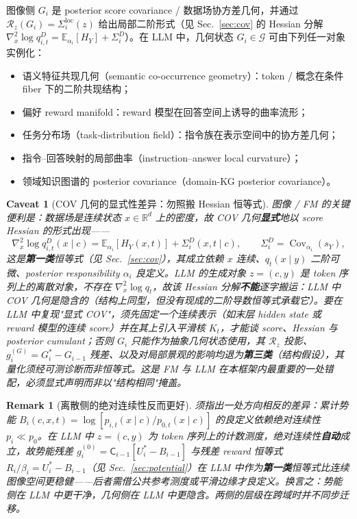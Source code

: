 \documentclass[11pt,a4paper]{article}
\newtheorem{remark}[theorem]{Remark}
\newtheorem{caveat}[theorem]{Caveat}
\DeclareMathOperator{\Cov}{Cov}
\newcommand{\E}{\mathbb{E}}
\newcommand{\R}{\mathbb{R}}
\newcommand{\cG}{\mathcal{G}}   %
\newcommand{\Rstr}{\mathcal{R}}     %
\newcommand{\Center}{\mathsf{C}}    %
\begin{document}
图像侧 $G_i$ 是 posterior score covariance / 数据场协方差几何，并通过 $\Rstr_z(G_i)=\Sigma_i^{\mathrm{loc}}(z)$ 给出局部二阶形式（见 Sec.~\ref{sec:cov} 的 Hessian 分解 $\nabla_x^2\log q_{i,t}^D=\E_{\alpha_i}[H_Y]+\Sigma_i^D$）。在 LLM 中，几何状态 $G_i\in\cG$ 可由下列任一对象实例化：
\begin{itemize}
\item 语义特征共现几何（semantic co-occurrence geometry）：token / 概念在条件 fiber 下的二阶共现结构；
\item 偏好 reward manifold：reward 模型在回答空间上诱导的曲率流形；
\item 任务分布场（task-distribution field）：指令族在表示空间中的协方差几何；
\item 指令--回答映射的局部曲率（instruction--answer local curvature）；
\item 领域知识图谱的 posterior covariance（domain-KG posterior covariance）。
\end{itemize}

\begin{caveat}[COV 几何的显式性差异：勿照搬 Hessian 恒等式]\label{cav:s11:explicit}
图像 / FM 的关键便利是：数据场是\emph{连续}状态 $x\in\R^d$ 上的密度，故 COV 几何\textbf{显式}地以 score Hessian 的形式出现——
\[
\nabla_x^2\log q_{i,t}^D(x\mid c)=\E_{\alpha_i}[H_Y(x,t)]+\Sigma_i^D(x,t\mid c),\qquad
\Sigma_i^D=\Cov_{\alpha_i}(s_Y),
\]
这是\textbf{第一类}恒等式（见 Sec.~\ref{sec:cov}），其成立依赖 $x$ 连续、$q_t(x\mid y)$ 二阶可微、posterior responsibility $\alpha_i$ 良定义。LLM 的生成对象 $z=(c,y)$ 是 token 序列上的\emph{离散}对象，不存在 $\nabla_x^2\log q_t$，故该 Hessian 分解\textbf{不能}逐字搬运：LLM 中 COV 几何是\emph{隐含的}（结构上同型，但没有现成的二阶导数恒等式承载它）。要在 LLM 中复现"显式 COV"，须先固定一个连续表示（如末层 hidden state 或 reward 模型的连续 score）并在其上引入平滑核 $K_t$，才能谈 score、Hessian 与 posterior cumulant；否则 $G_i$ 只能作为\emph{抽象几何状态}使用，其 $\Rstr_z$ 投影、$g_i^{(G)}=G_i^*-G_{i-1}$ 残差、以及对局部景观的影响均退为\textbf{第三类}（结构假设），其量化须经可测诊断而非恒等式。这是 FM 与 LLM 在本框架内最重要的一处错配，必须显式声明而非以"结构相同"掩盖。
\end{caveat}

\begin{remark}[离散侧的绝对连续性反而更好]\label{rem:s11:abscont}
须指出一处方向相反的差异：累计势能 $B_i(c,x,t)=\log[p_{i,t}(x\mid c)/p_{0,t}(x\mid c)]$ 的良定义依赖绝对连续性 $p_{i}\ll p_{0}$。在 LLM 中 $z=(c,y)$ 为 token 序列上的计数测度，绝对连续性\textbf{自动}成立，故势能残差 $g_i^{(0)}=\Center_{i-1}[U_i^*-B_{i-1}]$ 与残差 reward 恒等式 $R_i/\beta_i=U_i^*-B_{i-1}$（见 Sec.~\ref{sec:potential}）在 LLM 中作为\textbf{第一类}恒等式比连续图像空间更稳健——后者需借公共参考测度或平滑边缘才良定义。换言之：\emph{势能侧}在 LLM 中更干净，\emph{几何侧}在 LLM 中更隐含。两侧的层级在跨域时并不同步迁移。
\end{remark}
\end{document}
